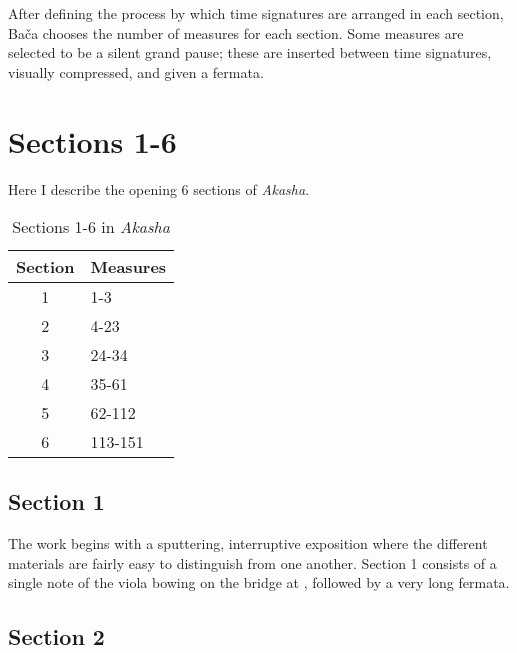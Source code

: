 After defining the process by which time signatures are arranged in each section, Bača chooses the number of measures for each section. Some measures are selected to be a silent grand pause; these are inserted between time signatures, visually compressed, and given a fermata.

\section{Sections 1-6}

Here I describe the opening 6 sections of \textit{Akasha}.

\begin{table}[H]
    \begin{tabular}{c|l}
        Section & Measures \\
        \toprule
        1 & 1-3 \\
        2 & 4-23 \\ 
        3 & 24-34 \\ 
        4 & 35-61 \\ 
        5 & 62-112 \\ 
        6 & 113-151 \\ 
    \end{tabular}
    \caption{Sections 1-6 in \textit{Akasha}}
    \label{tab:akasha-1-6-measures}
\end{table}

\subsection{Section 1}

The work begins with a sputtering, interruptive exposition where the different materials are fairly easy to distinguish from one another. Section 1 consists of a single note of the viola bowing on the bridge at , followed by a very long fermata. %


\subsection{Section 2}

